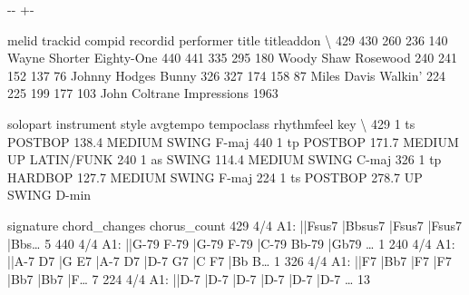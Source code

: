 \documentclass[letterpaper,10pt,english]{sphinxmanual}
\newlength\nbsphinxcodecellspacing
\begin{document}
{
\begin{sphinxVerbatim}[commandchars=\\\{\}]
\llap{\color{nbsphinxin}[13]:\,\hspace{\fboxrule}\hspace{\fboxsep}}
\end{sphinxVerbatim}
}

{

\kern-\sphinxverbatimsmallskipamount\kern-\baselineskip
\kern+\FrameHeightAdjust\kern-\fboxrule
\vspace{\nbsphinxcodecellspacing}

\begin{sphinxVerbatim}[commandchars=\\\{\}]
\llap{\color{nbsphinxout}[13]:\,\hspace{\fboxrule}\hspace{\fboxsep}}     melid  trackid  compid  recordid      performer        title titleaddon  \textbackslash{}
429    430      260     236       140  Wayne Shorter   Eighty-One
440    441      335     295       180     Woody Shaw     Rosewood
240    241      152     137        76  Johnny Hodges        Bunny
326    327      174     158        87    Miles Davis      Walkin'
224    225      199     177       103  John Coltrane  Impressions       1963

     solopart instrument    style  avgtempo tempoclass  rhythmfeel    key  \textbackslash{}
429         1         ts  POSTBOP     138.4     MEDIUM       SWING  F-maj
440         1         tp  POSTBOP     171.7  MEDIUM UP  LATIN/FUNK
240         1         as    SWING     114.4     MEDIUM       SWING  C-maj
326         1         tp  HARDBOP     127.7     MEDIUM       SWING  F-maj
224         1         ts  POSTBOP     278.7         UP       SWING  D-min

    signature                                      chord\_changes  chorus\_count
429       4/4  A1: ||Fsus7   |Bbsus7   |Fsus7   |Fsus7   |Bbs{\ldots}             5
440       4/4  A1: ||G-79 F-79 |G-79 F-79 |C-79 Bb-79 |Gb79  {\ldots}             1
240       4/4  A1: ||A-7 D7 |G E7 |A-7 D7 |D-7 G7 |C F7 |Bb B{\ldots}             1
326       4/4  A1: ||F7   |Bb7   |F7   |F7   |Bb7   |Bb7   |F{\ldots}             7
224       4/4  A1: ||D-7   |D-7   |D-7   |D-7   |D-7   |D-7  {\ldots}            13
\end{sphinxVerbatim}
}
\end{document}
